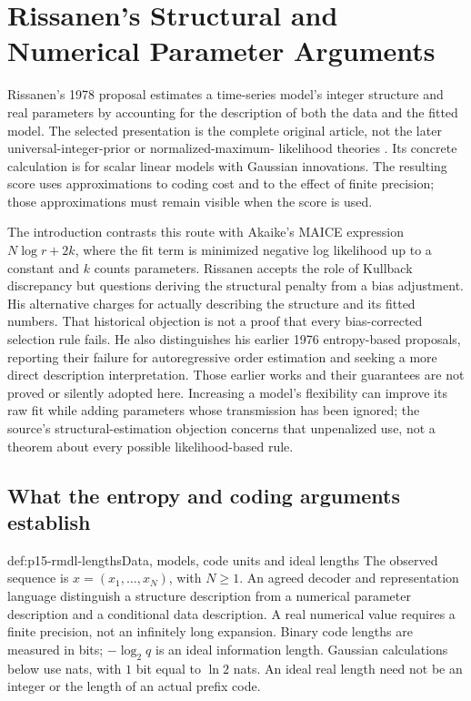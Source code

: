 \chapter{Rissanen's Structural and Numerical Parameter Arguments}
\label{sec:p15-rissanen-structural-and-numerical-inference}

Rissanen's 1978 proposal estimates a time-series model's integer structure
and real parameters by accounting for the description of both the data and
the fitted model. The selected presentation is the complete original
article, not the later universal-integer-prior or normalized-maximum-
likelihood theories \cite{Rissanen1978Modeling}. Its concrete calculation is
for scalar linear models with Gaussian innovations. The resulting score
uses approximations to coding cost and to the effect of finite precision;
those approximations must remain visible when the score is used.

The introduction contrasts this route with Akaike's MAICE expression
\(N\log r+2k\), where the fit term is minimized negative log likelihood
up to a constant and \(k\) counts parameters. Rissanen accepts the role
of Kullback discrepancy but questions deriving the structural penalty
from a bias adjustment. His alternative charges for actually describing
the structure and its fitted numbers. That historical objection is not a
proof that every bias-corrected selection rule fails.
He also distinguishes his earlier 1976 entropy-based proposals, reporting
their failure for autoregressive order estimation and seeking a more direct
description interpretation. Those earlier works and their guarantees are
not proved or silently adopted here. Increasing a model's flexibility can
improve its raw fit while adding parameters whose transmission has been
ignored; the source's structural-estimation objection concerns that
unpenalized use, not a theorem about every possible likelihood-based rule.

\section{What the entropy and coding arguments establish}
\label{sec:p15-rmdl-coding}

\begin{hbdefinition}{def:p15-rmdl-lengths}{Data, models, code units and ideal lengths}
The observed sequence is \(x=(x_1,\ldots,x_N)\), with \(N\geq1\).
An agreed decoder and representation language distinguish a structure
description from a numerical parameter description and a conditional data
description. A real numerical value requires a finite precision, not an
infinitely long expansion. Binary code lengths are measured in bits;
\(-\log_2 q\) is an ideal information length. Gaussian calculations
below use nats, with \(1\) bit equal to \(\ln2\) nats. An ideal real
length need not be an integer or the length of an actual prefix code.
\end{hbdefinition}

